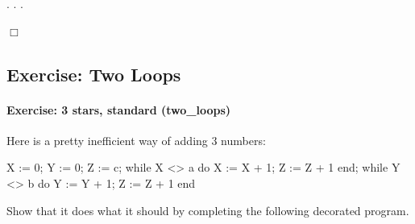 \documentclass[12pt]{report}
\begin{document}
\begin{coqdoccode}
\coqdocindent{1.00em}
   .\coqdoceol
\coqdocnoindent
{}.  .\coqdoceol
\end{coqdoccode}
\ensuremath{\Box} 
\begin{coqdoccode}
\coqdocemptyline
\end{coqdoccode}
\subsection{Exercise: Two Loops}



\paragraph{Exercise: 3 stars, standard (two\_loops)}




    Here is a pretty inefficient way of adding 3 numbers:


     X := 0;
     Y := 0;
     Z := c;
     while X <> a do
       X := X + 1;
       Z := Z + 1
     end;
     while Y <> b do
       Y := Y + 1;
       Z := Z + 1
     end


    Show that it does what it should by completing the
    following decorated program.
\end{document}
